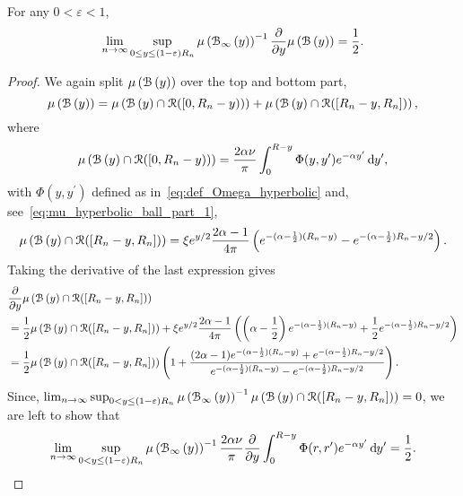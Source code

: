 \begin{lemma}
For any $0 < \varepsilon < 1$,
\[
	\lim_{n \to \infty} \sup_{0 \le y \le (1-\varepsilon)R_n} \mu\left({\mathcal B}_{\infty}\left(y\right)\right)^{-1}
	\frac{\partial}{\partial y} \mu\left({\mathcal B}\left(y\right)\right) 
	= \frac{1}{2}.
\]
\end{lemma}

\begin{proof}
We again split $\mu\left({\mathcal B}\left(y\right)\right)$ over the top and bottom part,
\[
	\mu\left({\mathcal B}\left(y\right)\right) 
	= \mu\left({\mathcal B}\left(y\right) \cap {\mathcal R} ([0,R_n - y))\right) + \mu\left({\mathcal B}\left(y\right) \cap {\mathcal R} ([R_n - y, R_n])\right),
\]
where
\[
	\mu\left({\mathcal B}\left(y\right) \cap {\mathcal R} ([0,R_n - y))\right) = \frac{2\alpha \nu}{\pi}\int_0^{R - y} \Phi(y,y^\prime) 
		e^{-\alpha y^\prime} \operatorname{\mathrm{d}\hspace{-2pt}} y^\prime,
\]
with $\Phi(y,y^\prime)$ defined as in~\eqref{eq:def_Omega_hyperbolic} and, see~\eqref{eq:mu_hyperbolic_ball_part_1},
\[
	\mu\left({\mathcal B}\left(y\right) \cap {\mathcal R} ([R_n - y, R_n])\right)
	= \xi e^{y/2}\frac{2\alpha - 1}{4\pi} \left( e^{-(\alpha - \frac{1}{2})(R_n - y)}
	- e^{-(\alpha - \frac{1}{2})R_n - y/2}\right).
\]
Taking the derivative of the last expression gives
\begin{align*}
	&\frac{\partial}{\partial y} \mu\left({\mathcal B}\left(y\right) \cap {\mathcal R} ([R_n - y, R_n])\right)\\
	&= \frac{1}{2}\mu\left({\mathcal B}\left(y\right) \cap {\mathcal R} ([R_n - y, R_n])\right)
		+ \xi e^{y/2}\frac{2\alpha - 1}{4\pi}\left(
		\left(\alpha - \frac{1}{2}\right)e^{-(\alpha - \frac{1}{2})(R_n - y)} 
		+ \frac{1}{2}e^{-(\alpha - \frac{1}{2})R_n - y/2}\right)\\
	&= \frac{1}{2}\mu\left({\mathcal B}\left(y\right) \cap {\mathcal R} ([R_n - y, R_n])\right)\left(1 +
		\frac{(2\alpha - 1)e^{-(\alpha - \frac{1}{2})(R_n - y)} + e^{-(\alpha - \frac{1}{2})R_n - y/2}}
		{e^{-(\alpha - \frac{1}{2})(R_n - y)} - e^{-(\alpha - \frac{1}{2})R_n - y/2}}\right).
\end{align*}
Since, $\lim_{n \to \infty} \sup_{0 < y \le (1-\varepsilon)R_n} \mu\left({\mathcal B}_{\infty}\left(y\right)\right)^{-1} \mu\left({\mathcal B}\left(y\right) \cap {\mathcal R} ([R_n - y, R_n])\right) = 0$, we are left to show that
\begin{equation}\label{eq:derivative_mu_hyp_ball_main}
	\lim_{n \to \infty} \sup_{0 < y \le (1-\varepsilon)R_n} \mu\left({\mathcal B}_{\infty}\left(y\right)\right)^{-1} \frac{2\alpha \nu}{\pi} \frac{\partial}{\partial y} \int_0^{R - y} \Phi(r,r^\prime) e^{-\alpha y^\prime} \operatorname{\mathrm{d}\hspace{-2pt}} y^\prime
	= \frac{1}{2}.
\end{equation}


\end{proof}
